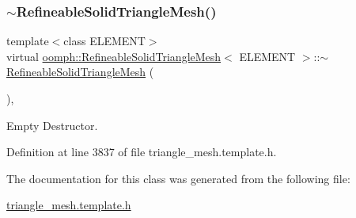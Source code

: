 \subsubsection{\texorpdfstring{$\sim$\+Refineable\+Solid\+Triangle\+Mesh()}{~RefineableSolidTriangleMesh()}}
{\footnotesize\ttfamily template$<$class E\+L\+E\+M\+E\+NT$>$ \\
virtual \hyperlink{classoomph_1_1RefineableSolidTriangleMesh}{oomph\+::\+Refineable\+Solid\+Triangle\+Mesh}$<$ E\+L\+E\+M\+E\+NT $>$\+::$\sim$\hyperlink{classoomph_1_1RefineableSolidTriangleMesh}{Refineable\+Solid\+Triangle\+Mesh} (\begin{DoxyParamCaption}{ }\end{DoxyParamCaption})\hspace{0.3cm}{\ttfamily [inline]}, {\ttfamily [virtual]}}



Empty Destructor. 



Definition at line 3837 of file triangle\+\_\+mesh.\+template.\+h.



The documentation for this class was generated from the following file\+:\begin{DoxyCompactItemize}
\item 
\hyperlink{triangle__mesh_8template_8h}{triangle\+\_\+mesh.\+template.\+h}\end{DoxyCompactItemize}
